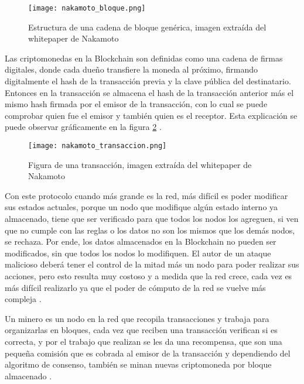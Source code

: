 \begin{figure}[H]
    \centering
    {\texttt{[image: nakamoto\_bloque.png]}}
    \caption{Estructura de una cadena de bloque genérica, imagen extraída del whitepaper de Nakamoto}
    \label{img:nakamoto_bloque}
\end{figure}


Las criptomonedas en la  Blockchain  son  definidas como una cadena de firmas digitales, donde cada dueño transfiere la moneda al próximo,
firmando digitalmente el hash de la transacción previa y la clave pública del destinatario. Entonces en la transacción se almacena el hash
de la transacción anterior más el mismo hash firmada por el emisor de la transacción, con lo cual se puede comprobar quien fue el emisor y también quien es el receptor.
Esta explicación se puede observar gráficamente en la figura \ref{img:nakamoto_transaccion} \cite[]{nakamoto_bitcoin_2008}. 

\begin{figure}[H]
    \centering
    {\texttt{[image: nakamoto\_transaccion.png]}}
    \caption{Figura de una transacción, imagen extraída del whitepaper de Nakamoto}
    \label{img:nakamoto_transaccion}
\end{figure}

Con este protocolo cuando más grande es la red,  más difícil es poder modificar sus estados actuales, 
porque un nodo que modifique algún estado interno ya almacenado,
tiene que ser verificado para que todos los nodos los agreguen, si ven que no cumple con las reglas o los datos
no son los mismos que los demás nodos, se rechaza. 
Por ende, los datos almacenados en la Blockchain no pueden ser modificados, sin que todos los nodos lo modifiquen.
El autor de un ataque malicioso deberá tener el control de la mitad más un nodo para poder realizar sus acciones, pero esto resulta
muy costoso y a medida que la red crece, cada vez es más difícil realizarlo ya que el poder de cómputo de la red se vuelve más compleja \cite[]{nakamoto_bitcoin_2008,joaquin_lopez_lerida_economiBlockchain_2016}. 

Un minero es un nodo en la red que recopila transacciones y trabaja para organizarlas en bloques, 
 cada vez que reciben una transacción verifican si es correcta, y por el trabajo que realizan se les da una recompensa,
que son una pequeña comisión que es cobrada al emisor de la transacción y dependiendo del algoritmo de consenso, también se minan nuevas 
criptomoneda por bloque almacenado \cite[]{nakamoto_bitcoin_2008,joaquin_lopez_lerida_economiBlockchain_2016,preukschat_Blockchain_2018}.

